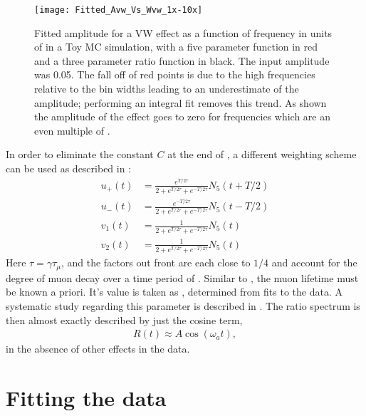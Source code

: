     \begin{figure}[]
        \centering
        \texttt{[image: Fitted\_Avw\_Vs\_Wvw\_1x-10x]}
        \caption[Cancellation of effect in Ratio Method versus frequency]{Fitted amplitude for a VW effect as a function of frequency in units of \wa in a Toy MC simulation, with a five parameter function in red and a three parameter ratio function in black. The input amplitude was 0.05. The fall off of red points is due to the high frequencies relative to the bin widths leading to an underestimate of the amplitude; performing an integral fit removes this trend. As shown the amplitude of the effect goes to zero for frequencies which are an even multiple of \wa.}
        \label{fig:CancellationInRatioMethod}
    \end{figure}



 In order to eliminate the constant $C$ at the end of , a different weighting scheme can be used as described in :
    \begin{equation}
    \begin{aligned}
        u_{+}(t) &= \frac{e^{T/2\tau}}{2 + e^{T/2\tau} + e^{-T/2\tau}} N_{5}(t+T/2) \\
        u_{-}(t) &= \frac{e^{-T/2\tau}}{2 + e^{T/2\tau} + e^{-T/2\tau}} N_{5}(t-T/2) \\
        v_{1}(t) &= \frac{1}{2 + e^{T/2\tau} + e^{-T/2\tau}} N_{5}(t) \\
        v_{2}(t) &= \frac{1}{2 + e^{T/2\tau} + e^{-T/2\tau}} N_{5}(t)
    \label{eqn:fourHistsInText}
    \end{aligned}
    \end{equation}
Here $\tau = \gamma\tau_{\mu}$, and the factors out front are each close to $1/4$ and account for the degree of muon decay over a time period of \Tatwo. Similar to \Ta, the muon lifetime must be known a priori. It's value is taken as , determined from fits to the data. A systematic study regarding this parameter is described in . The ratio spectrum is then almost exactly described by just the cosine term,
    \begin{align} \label{eq:threeparamratio}
        R(t) \approx A \cos(\omega_{a}t),
    \end{align}
in the absence of other effects in the data. 




\section{Fitting the data}
\label{sec:Fitting}



